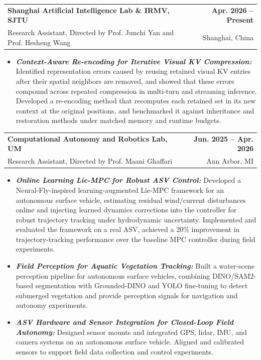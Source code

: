 \documentclass[11pt,letterpaper]{article}
\makeatletter
\newcommand{\resumeSubheading}[4]{
    \begin{tabularx}{\textwidth}{@{}Xr@{}}
        \textbf{#1} & \textbf{#2} \\
        #3 & #4 \\
    \end{tabularx}
}
\newcommand{\resumeItem}[1]{
    \item #1
}
\makeatother
\begin{document}
\resumeSubheading
{Shanghai Artificial Intelligence Lab \& IRMV, SJTU }
{Apr. 2026 -- Present}
{\hspace*{1.4em}Research Assistant, Directed by Prof. Junchi Yan and Prof. Hesheng Wang}
{Shanghai, China}
\begin{itemize}[leftmargin=2.4em, itemsep=0.5pt, topsep=0pt]
    \small
    \resumeItem{\textbf{\textit{Context-Aware Re-encoding for Iterative Visual KV Compression:}} Identified representation errors caused by reusing retained visual KV entries after their spatial neighbors are removed, and showed that these errors compound across repeated compression in multi-turn and streaming inference. Developed a re-encoding method that recomputes each retained set in its new context at the original positions, and benchmarked it against inheritance and restoration methods under matched memory and runtime budgets.}
\end{itemize}

\resumeSubheading
{Computational Autonomy and Robotics Lab, UM }
{Jun. 2025 -- Apr. 2026}
{\hspace*{1.4em}Research Assistant, Directed by Prof. Maani Ghaffari}
{Ann Arbor, MI}
\begin{itemize}[leftmargin=2.4em, itemsep=0.5pt, topsep=0pt]
    \small
    \resumeItem{\textbf{\textit{Online Learning Lie-MPC for Robust ASV Control:}} Developed a Neural-Fly-inspired learning-augmented Lie-MPC framework for an autonomous surface vehicle, estimating residual wind/current disturbances online and injecting learned dynamics corrections into the controller for robust trajectory tracking under hydrodynamic uncertainty. Implemented and evaluated the framework on a real ASV, achieved a 20\% improvement in trajectory-tracking performance over the baseline MPC controller during field experiments.}
    \newpage
\resumeItem{\textbf{\textit{Field Perception for Aquatic Vegetation Tracking:}} Built a water-scene perception pipeline for autonomous surface vehicles, combining DINO/SAM2-based segmentation with Grounded-DINO and YOLO fine-tuning to detect submerged vegetation and provide perception signals for navigation and autonomy experiments.}
    \resumeItem{\textbf{\textit{ASV Hardware and Sensor Integration for Closed-Loop Field Autonomy:}} Designed sensor mounts and integrated GPS, lidar, IMU, and camera systems on an autonomous surface vehicle. Aligned and calibrated sensors to support field data collection and control experiments.}
\end{itemize}
\end{document}
